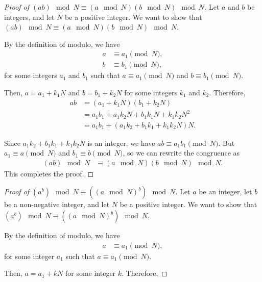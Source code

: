 \documentclass[12pt,openany]{book}
\theoremstyle{definition}
\begin{document}
	\newpage
	\begin{proof}[Proof of $(ab) \mod N \equiv (a \mod N)(b \mod N) \mod N$]
		Let $a$ and $b$ be integers, and let $N$ be a positive integer. We want to show that $(ab) \mod N \equiv (a \mod N)(b \mod N) \mod N$.
		
		By the definition of modulo, we have
		\begin{align*}
			a &\equiv a_1 \pmod{N}, \\
			b &\equiv b_1 \pmod{N},
		\end{align*}
		for some integers $a_1$ and $b_1$ such that $a \equiv a_1 \pmod{N}$ and $b \equiv b_1 \pmod{N}$.
		
		Then, $a = a_1 + k_1N$ and $b = b_1 + k_2N$ for some integers $k_1$ and $k_2$. Therefore,
		\begin{align*}
			ab &= (a_1 + k_1N)(b_1 + k_2N) \\
			&= a_1b_1 + a_1k_2N + b_1k_1N + k_1k_2N^2 \\
			&= a_1b_1 + (a_1k_2 + b_1k_1 + k_1k_2N)N.
		\end{align*}
		
		Since $a_1k_2 + b_1k_1 + k_1k_2N$ is an integer, we have $ab \equiv a_1b_1 \pmod{N}$. But $a_1 \equiv a \pmod{N}$ and $b_1 \equiv b \pmod{N}$, so we can rewrite the congruence as
		\begin{align*}
			(ab) \mod N &\equiv (a \mod N)(b \mod N) \mod N.
		\end{align*}
		This completes the proof.
	\end{proof}
	
	\begin{proof}[Proof of $(a^b) \mod N \equiv ((a \mod N)^b) \mod N$]
		Let $a$ be an integer, let $b$ be a non-negative integer, and let $N$ be a positive integer. We want to show that $(a^b) \mod N \equiv ((a \mod N)^b) \mod N$.
		
		By the definition of modulo, we have
		\begin{align*}
			a &\equiv a_1 \pmod{N},
		\end{align*}
		for some integer $a_1$ such that $a \equiv a_1 \pmod{N}$.
		
		Then, $a = a_1 + kN$ for some integer $k$. Therefore,
	\end{proof}
	
\end{document}
